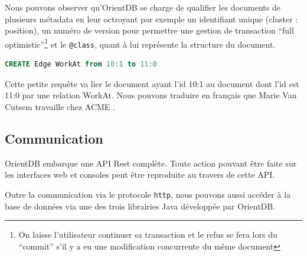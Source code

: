 \documentclass[a4paper,fleqn,12pt,oneside]{book}
\begin{document}
Nous pouvons observer qu'OrientDB se charge de qualifier les documents de plusieurs métadata en leur octroyant par exemple un identifiant unique (\no cluster : position), un numéro de version pour permettre une gestion de transaction \enquote{full optimistic}\footnote{On laisse l'utilisateur continuer sa transaction et le refus se fera lors du \enquote{commit} s'il y a eu une modification concurrente du même document} et le \texttt{@class}, quant à lui représente la structure du document.

\begin{lstlisting}[language=SQL]
CREATE Edge WorkAt from 10:1 to 11:0
\end{lstlisting}

Cette petite requête va lier le document ayant l'id 10:1 au document dont l'id est 11:0 par une relation WorkAt. Nous pouvons traduire en français que Marie Van Cutsem travaille chez ACME \cite{OrientDBGettingStarted}.

\subsection{Communication}

OrientDB embarque une API Rest complète\cite{fielding2000architectural}. Toute action pouvant être faite sur les interfaces web et consoles peut être reproduite au travers de cette API.

Outre la communication via le protocole \texttt{http}, nous pouvons aussi accéder à la base de données via une des trois librairies Java développée par OrientDB.
\end{document}
